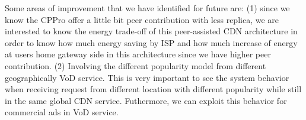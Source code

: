 Some areas of improvement that we have identified for future are: (1) since we know the CPPro offer a little bit peer contribution with less replica, we are interested to know the energy trade-off of this peer-assisted CDN architecture in order to know how much energy saving by ISP and how much increase of energy at users home gateway side in this architecture since we have higher peer contribution.   
(2) Involving the different popularity model from different geographically VoD service.
This is very important to see the system behavior when receiving request from different location with different popularity while still in the same global CDN service. 
Futhermore, we can exploit this behavior for commercial ads in VoD service.